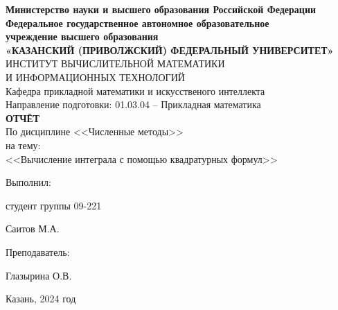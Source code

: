 \documentclass[a4paper,12pt]{article}
\begin{document}
\begin{center}
\hfill \break
\textbf{\large{Министерство науки и высшего образования Российской Федерации\\
Федеральное государственное автономное образовательное\\
учреждение высшего образования}}
\\
\large{\textbf{«КАЗАНСКИЙ (ПРИВОЛЖСКИЙ) ФЕДЕРАЛЬНЫЙ УНИВЕРСИТЕТ»}}\\
\hfill \break
\large{ИНСТИТУТ ВЫЧИСЛИТЕЛЬНОЙ МАТЕМАТИКИ\\ И ИНФОРМАЦИОННЫХ ТЕХНОЛОГИЙ}\\
 \hfill \break
\large{Кафедра прикладной математики и искусственого интеллекта}\\
\hfill\break
\hfill \break
\large{Направление подготовки: 01.03.04 – Прикладная математика}\\
\hfill \break
\hfill \break
\textbf{\large{ОТЧЁТ}}\\
\large{По дисциплине <<Численные методы>>}\\
\large{на тему:}\\
\large{<<Вычисление интеграла с помощью квадратурных формул>>}\\
\hfill \break
\hfill \break
\end{center}

\hfill \break
\begin{flushright}
			
    \large{Выполнил:}
    
    \large{студент группы 09-221}
    
    \large{Саитов М.А.}
    
    \large{Преподаватель:}
    
    \large{Глазырина О.В.}
    
\end{flushright}
\vfill
\begin{center} \large{Казань, 2024 год} \end{center}
\thispagestyle{empty}
 
\end{document}
